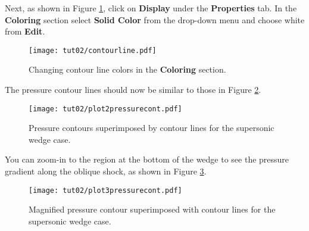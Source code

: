 Next, as shown in Figure \ref{fig2:colorby2}, click on \textbf{Display} under the \textbf{Properties} tab. In the \textbf{Coloring} section select \textbf{Solid Color} from the drop-down menu and choose white from \textbf{Edit}.
\begin{figure}[htbp]
    \centering
    \texttt{[image: tut02/contourline.pdf]}
    \caption{Changing contour line colors in the \textbf{Coloring} section.}
    \label{fig2:colorby2}
\end{figure}
The pressure contour lines should now be similar to those in Figure \ref{fig2:pressure_contour_lines}.
\begin{figure}[htbp]
    \centering
    \texttt{[image: tut02/plot2pressurecont.pdf]}
    \caption{Pressure contours superimposed by contour lines for the supersonic wedge case.}
    \label{fig2:pressure_contour_lines}
\end{figure}
You can zoom-in to the region at the bottom of the wedge to see the pressure gradient along the oblique
shock, as shown in Figure \ref{fig2:pressure_contour_lines_zoom}.
\begin{figure}[htbp]
    \centering
    \texttt{[image: tut02/plot3pressurecont.pdf]}
    \caption{Magnified pressure contour superimposed with contour lines for the supersonic wedge case.}
    \label{fig2:pressure_contour_lines_zoom}
\end{figure}

